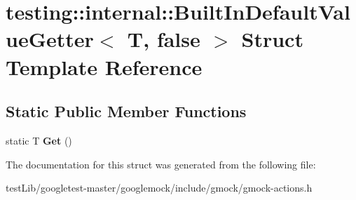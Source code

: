 \hypertarget{structtesting_1_1internal_1_1BuiltInDefaultValueGetter_3_01T_00_01false_01_4}{}\section{testing\+:\+:internal\+:\+:Built\+In\+Default\+Value\+Getter$<$ T, false $>$ Struct Template Reference}
\label{structtesting_1_1internal_1_1BuiltInDefaultValueGetter_3_01T_00_01false_01_4}
\subsection*{Static Public Member Functions}
\begin{DoxyCompactItemize}
\item 
\mbox{\label{structtesting_1_1internal_1_1BuiltInDefaultValueGetter_3_01T_00_01false_01_4_a8c8e929666f61272961eea21a60de4ad}} 
static T {\bfseries Get} ()
\end{DoxyCompactItemize}


The documentation for this struct was generated from the following file\+:\begin{DoxyCompactItemize}
\item 
test\+Lib/googletest-\/master/googlemock/include/gmock/gmock-\/actions.\+h\end{DoxyCompactItemize}
